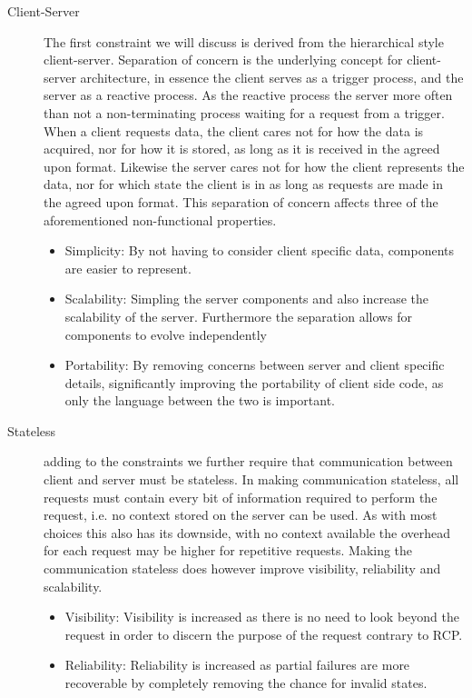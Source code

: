 \begin{description}
    \item [Client-Server] The first constraint we will discuss is derived from the hierarchical style client-server.
    Separation of concern is the underlying concept for client-server architecture, in essence the client serves as a trigger process, and the server as a reactive process.
    As the reactive process the server more often than not a non-terminating process waiting for a request from a trigger.
    When a client requests data, the client cares not for how the data is acquired, nor for how it is stored, as long as it is received in the agreed upon format.
    Likewise the server cares not for how the client represents the data, nor for which state the client is in as long as requests are made in the agreed upon format.
    This separation of concern affects three of the aforementioned non-functional properties.
    \begin{itemize}
        \item Simplicity: By not having to consider client specific data, components are easier to represent.
        \item Scalability: Simpling the server components and also increase the scalability of the server. Furthermore the separation allows for components to evolve independently
        \item Portability: By removing concerns between server and client specific details, significantly improving the portability of client side code, as only the language between the two is important.
    \end{itemize}
    \item [Stateless] adding to the constraints we further require that communication between client and server must be stateless.
    In making communication stateless, all requests must contain every bit of information required to perform the request, i.e. no context stored on the server can be used.
    As with most choices this also has its downside, with no context available the overhead for each request may be higher for repetitive requests.
    Making the communication stateless does however improve visibility, reliability and scalability.
    \begin{itemize}
        \item Visibility: Visibility is increased as there is no need to look beyond the request in order to discern the purpose of the request contrary to RCP.
        \item Reliability: Reliability is increased as partial failures are more recoverable by completely removing the chance for invalid states.

\end{itemize}
\end{description}
